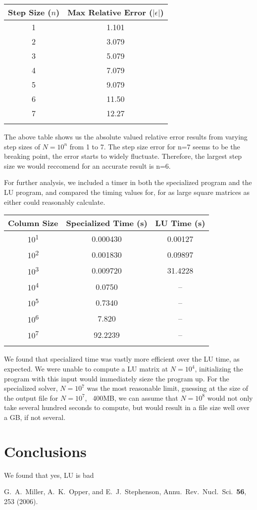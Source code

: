 \documentclass[10pt,showpacs,preprintnumbers,footinbib,amsmath,amssymb,aps,prl,twocolumn,groupedaddress,superscriptaddress,showkeys]{revtex4-1}
\begin{document}
\begin{center}
	\begin{tabular}{cc}
		\hline \hline
			Step Size ($n$) &  Max Relative Error ($|\epsilon|$)\\
			\hline
			1 & 1.101\\
			2 & 3.079\\
			3 & 5.079\\
			4 & 7.079\\
			5 & 9.079\\
			6 & 11.50\\
			7 & 12.27\\
			\hline
			\label{errortable}
	\end{tabular}
\end{center}
	
	The above table shows us the absolute valued relative error results from varying step sizes of $N=10^{n}$ from 1 to 7. The step size error for n=7 seems to be the breaking point, the error starts to widely fluctuate. Therefore, the largest step size we would reccomend for an accurate result is n=6.  


	For further analysis, we included a timer in both the specialized program and the LU program, and compared the timing values for, for as large square matrices as either could reasonably calculate.

	\begin{center}
		\begin{tabular}{ccc}
			\hline \hline
			Column Size & Specialized Time (s) & LU Time (s)\\
			\hline
			10\textsuperscript{1} & 0.000430 & 0.00127\\
			10\textsuperscript{2} & 0.001830 &  0.09897\\
			10\textsuperscript{3} & 0.009720 & 31.4228\\
			10\textsuperscript{4} & 0.0750       &  --\\
			10\textsuperscript{5} & 0.7340  & --\\
			10\textsuperscript{6} & 7.820  & --\\
			10\textsuperscript{7} & 92.2239  & --\\
			\hline
			\label{timingtable}
		\end{tabular}
	\end{center}
	We found that specialized time was vastly more efficient over the LU time, as expected. We were unable to compute a LU matrix at $N=10^{4}$, initializing the program with this input would immediately sieze the program up. For the specialized solver, $N=10^{7}$ was the most reasonable limit, guessing at the size of the output file for $N=10^{7}$, ~400MB, we can assume that $N=10^{8}$ would not only take several hundred seconds to compute, but would result in a file size well over a GB, if not several. 	

\section{Conclusions}
We found that yes, LU is bad
\begin{thebibliography}{99}
 G.~A.~Miller, A.~K.~Opper, and E.~J.~Stephenson, Annu.~Rev.~Nucl.~Sci.~{\bf 56}, 253 (2006).
\end{thebibliography}
\end{document}
